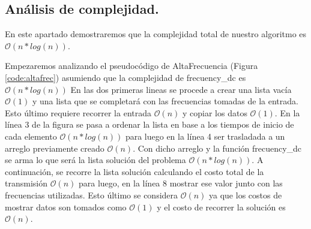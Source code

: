 \vspace*{0.6cm}


\vspace*{0.3cm}



\vspace*{0.6cm}

\subsection{Análisis de complejidad.}

\vspace*{0.3cm}

En este apartado demostraremos que la complejidad total de nuestro algoritmo es $\mathcal{O}(n*log(n))$.

Empezaremos analizando el pseudocódigo de AltaFrecuencia (Figura \ref{code:altafrec}) asumiendo que la complejidad de frecuency_dc es $\mathcal{O}(n*log(n))$
En las dos primeras lineas se procede a crear una lista vacía $\mathcal{O}(1)$ y una lista que se completará con las frecuencias tomadas de la entrada. Esto último requiere recorrer la entrada $\mathcal{O}(n)$ y copiar los datos $\mathcal{O}(1)$.
En la línea 3 de la figura se pasa a ordenar la lista en base a los tiempos de inicio de cada elemento $\mathcal{O}(n*log(n))$ para luego en la línea 4 ser trasladada a un arreglo previamente creado $\mathcal{O}(n)$. Con dicho arreglo y la función frecuency_dc se arma lo que será la lista solución del problema $\mathcal{O}(n*log(n))$. A continuación, se recorre la lista solución calculando el costo total de la transmisión $\mathcal{O}(n)$ para luego, en la línea 8 mostrar ese valor junto con las frecuencias utilizadas. Esto último se considera $\mathcal{O}(n)$ ya que los costos de mostrar datos son tomados como $\mathcal{O}(1)$ y el costo de recorrer la solución es $\mathcal{O}(n)$.

